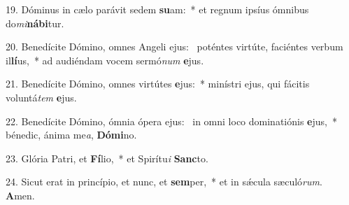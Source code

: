 19. Dóminus in cælo parávit sedem \textbf{su}am:~*  et regnum ipsíus ómnibus do\textit{mi}\textbf{ná}\textbf{bi}tur.\

20. Benedícite Dómino, omnes Angeli ejus: \dag\  poténtes virtúte, faciéntes verbum il\textbf{lí}us,~*  ad audiéndam vocem sermó\textit{num} \textbf{e}jus.\

21. Benedícite Dómino, omnes virtútes \textbf{e}jus:~*  minístri ejus, qui fácitis voluntá\textit{tem} \textbf{e}jus.\

22. Benedícite Dómino, ómnia ópera ejus: \dag\  in omni loco dominatiónis \textbf{e}jus,~*  bénedic, ánima me\textit{a}, \textbf{Dó}\textbf{mi}no.\

23. Glória Patri, et \textbf{Fí}lio,~*  et Spirítu\textit{i} \textbf{Sanc}to.\

24. Sicut erat in princípio, et nunc, et \textbf{sem}per,~*  et in sǽcula sæculó\textit{rum}. \textbf{A}men.\

